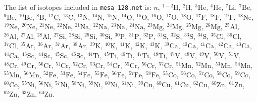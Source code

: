 The list of isotopes included in \texttt{mesa\_128.net} is:
$n$,
$^{1-2}\mathrm{H}$,
$^{2}\mathrm{H}$,
$^{3}\mathrm{He}$,
$^{4}\mathrm{He}$,
$^{7}\mathrm{Li}$,
$^{7}\mathrm{Be}$,
$^{9}\mathrm{Be}$,
$^{10}\mathrm{Be}$,
$^{8}\mathrm{B}$,
$^{12}\mathrm{C}$,
$^{13}\mathrm{C}$,
$^{13}\mathrm{N}$,
$^{14}\mathrm{N}$,
$^{15}\mathrm{N}$,
$^{14}\mathrm{O}$,
$^{15}\mathrm{O}$,
$^{16}\mathrm{O}$,
$^{17}\mathrm{O}$,
$^{18}\mathrm{O}$,
$^{17}\mathrm{F}$,
$^{18}\mathrm{F}$,
$^{19}\mathrm{F}$,
$^{18}\mathrm{Ne}$,
$^{19}\mathrm{Ne}$,
$^{20}\mathrm{Ne}$,
$^{21}\mathrm{Ne}$,
$^{22}\mathrm{Ne}$,
$^{21}\mathrm{Na}$,
$^{22}\mathrm{Na}$,
$^{23}\mathrm{Na}$,
$^{24}\mathrm{Na}$,
$^{23}\mathrm{Mg}$,
$^{24}\mathrm{Mg}$,
$^{25}\mathrm{Mg}$,
$^{26}\mathrm{Mg}$,
$^{25}\mathrm{Al}$,
$^{26}\mathrm{Al}$,
$^{27}\mathrm{Al}$,
$^{28}\mathrm{Al}$,
$^{27}\mathrm{Si}$,
$^{28}\mathrm{Si}$,
$^{29}\mathrm{Si}$,
$^{30}\mathrm{Si}$,
$^{30}\mathrm{P}$,
$^{31}\mathrm{P}$,
$^{32}\mathrm{P}$,
$^{31}\mathrm{S}$,
$^{32}\mathrm{S}$,
$^{33}\mathrm{S}$,
$^{34}\mathrm{S}$,
$^{35}\mathrm{Cl}$,
$^{36}\mathrm{Cl}$,
$^{37}\mathrm{Cl}$,
$^{35}\mathrm{Ar}$,
$^{36}\mathrm{Ar}$,
$^{37}\mathrm{Ar}$,
$^{38}\mathrm{Ar}$,
$^{39}\mathrm{K}$,
$^{40}\mathrm{K}$,
$^{41}\mathrm{K}$,
$^{42}\mathrm{K}$,
$^{43}\mathrm{K}$,
$^{39}\mathrm{Ca}$,
$^{40}\mathrm{Ca}$,
$^{41}\mathrm{Ca}$,
$^{42}\mathrm{Ca}$,
$^{43}\mathrm{Ca}$,
$^{44}\mathrm{Ca}$,
$^{43}\mathrm{Sc}$,
$^{44}\mathrm{Sc}$,
$^{45}\mathrm{Sc}$,
$^{46}\mathrm{Sc}$,
$^{44}\mathrm{Ti}$,
$^{45}\mathrm{Ti}$,
$^{46}\mathrm{Ti}$,
$^{47}\mathrm{Ti}$,
$^{48}\mathrm{Ti}$,
$^{47}\mathrm{V}$,
$^{48}\mathrm{V}$,
$^{49}\mathrm{V}$,
$^{50}\mathrm{V}$,
$^{51}\mathrm{V}$,
$^{48}\mathrm{Cr}$,
$^{49}\mathrm{Cr}$,
$^{50}\mathrm{Cr}$,
$^{51}\mathrm{Cr}$,
$^{52}\mathrm{Cr}$,
$^{53}\mathrm{Cr}$,
$^{54}\mathrm{Cr}$,
$^{55}\mathrm{Cr}$,
$^{56}\mathrm{Cr}$,
$^{57}\mathrm{Cr}$,
$^{51}\mathrm{Mn}$,
$^{52}\mathrm{Mn}$,
$^{53}\mathrm{Mn}$,
$^{54}\mathrm{Mn}$,
$^{55}\mathrm{Mn}$,
$^{56}\mathrm{Mn}$,
$^{52}\mathrm{Fe}$,
$^{53}\mathrm{Fe}$,
$^{54}\mathrm{Fe}$,
$^{55}\mathrm{Fe}$,
$^{56}\mathrm{Fe}$,
$^{57}\mathrm{Fe}$,
$^{58}\mathrm{Fe}$,
$^{55}\mathrm{Co}$,
$^{56}\mathrm{Co}$,
$^{57}\mathrm{Co}$,
$^{58}\mathrm{Co}$,
$^{59}\mathrm{Co}$,
$^{60}\mathrm{Co}$,
$^{55}\mathrm{Ni}$,
$^{56}\mathrm{Ni}$,
$^{57}\mathrm{Ni}$,
$^{58}\mathrm{Ni}$,
$^{59}\mathrm{Ni}$,
$^{60}\mathrm{Ni}$,
$^{61}\mathrm{Ni}$,
$^{59}\mathrm{Cu}$,
$^{60}\mathrm{Cu}$,
$^{61}\mathrm{Cu}$,
$^{62}\mathrm{Cu}$,
$^{60}\mathrm{Zn}$,
$^{61}\mathrm{Zn}$,
$^{62}\mathrm{Zn}$,
$^{63}\mathrm{Zn}$,
$^{64}\mathrm{Zn}$.

